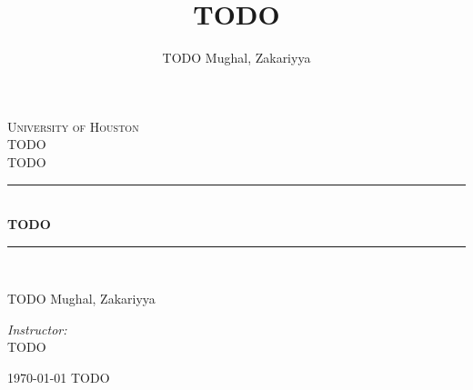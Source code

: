 \documentclass[12pt]{article}
\title{TODO}
\author{%
TODO Mughal, Zakariyya
}
\date{}
\newcommand{\HRule}{\rule{\linewidth}{0.5mm}}
\begin{document}
\begin{titlepage}
\begin{center}
\textsc{\LARGE University of Houston} \\[1.5cm]

\textsc{\Large TODO\\%
 TODO} \\[0.5cm] %

\HRule \\[0.4cm]
{\huge \bfseries TODO} \\[0.4cm] %
\HRule \\[1.5cm]

\begin{flushleft} \large
TODO
Mughal, Zakariyya
\end{flushleft}
\begin{flushright} \large
\emph{Instructor:} \\
TODO
\end{flushright}

\vfill

{\large \today{} TODO} %
\end{center}
\end{titlepage}

%

%
%
\end{document}
